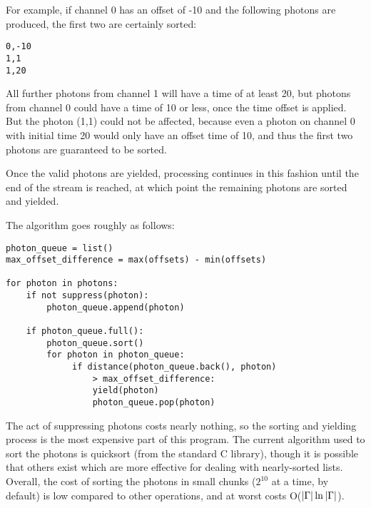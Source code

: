 For example, if channel 0 has an offset of -10 and the following photons are produced, the first two are certainly sorted:
\begin{verbatim}
0,-10
1,1
1,20
\end{verbatim}
All further photons from channel 1 will have a time of at least 20, but photons from channel 0 could have a time of 10 or less, once the time offset is applied. But the photon (1,1) could not be affected, because even a photon on channel 0 with initial time 20 would only have an offset time of 10, and thus the first two photons are guaranteed to be sorted.

Once the valid photons are yielded, processing continues in this fashion until the end of the stream is reached, at which point the remaining photons are sorted and yielded.

The algorithm goes roughly as follows:
\lstset{language=Python}
\begin{lstlisting}
photon_queue = list()
max_offset_difference = max(offsets) - min(offsets)

for photon in photons:
    if not suppress(photon):
        photon_queue.append(photon)
    
    if photon_queue.full():
        photon_queue.sort()
        for photon in photon_queue:
             if distance(photon_queue.back(), photon)
                 > max_offset_difference:
                 yield(photon)
                 photon_queue.pop(photon)
\end{lstlisting}

The act of suppressing photons costs nearly nothing, so the sorting and yielding process is the most expensive part of this program. The current algorithm used to sort the photons is quicksort (from the standard C library), though it is possible that others exist which are more effective for dealing with nearly-sorted lists. Overall, the cost of sorting the photons in small chunks ($2^{10}$ at a time, by default) is low compared to other operations, and at worst costs O($\left|\Gamma\right|\ln{\ensuremath{\left|\Gamma\right|}}$).